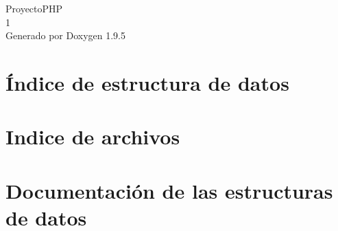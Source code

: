 \documentclass[twoside]{book}
\newcommand{\+}{\discretionary{\mbox{\scriptsize$\hookleftarrow$}}{}{}}
\newcommand{\clearemptydoublepage}{%
    \newpage{\pagestyle{empty}\cleardoublepage}%
  }
\begin{document}
  \raggedbottom
    \hypersetup{pageanchor=false,
                bookmarksnumbered=true,
                pdfencoding=unicode
               }
  \begin{titlepage}
  \vspace*{7cm}
  \begin{center}%
  {\Large Proyecto\+PHP}\\
  [1ex]\large 1 \\
  \vspace*{1cm}
  {\large Generado por Doxygen 1.9.5}\\
  \end{center}
  \end{titlepage}
  \clearemptydoublepage
  \tableofcontents
  \clearemptydoublepage
  \hypersetup{pageanchor=true}
\chapter{Índice de estructura de datos}

\chapter{Indice de archivos}

\chapter{Documentación de las estructuras de datos}







\end{document}
